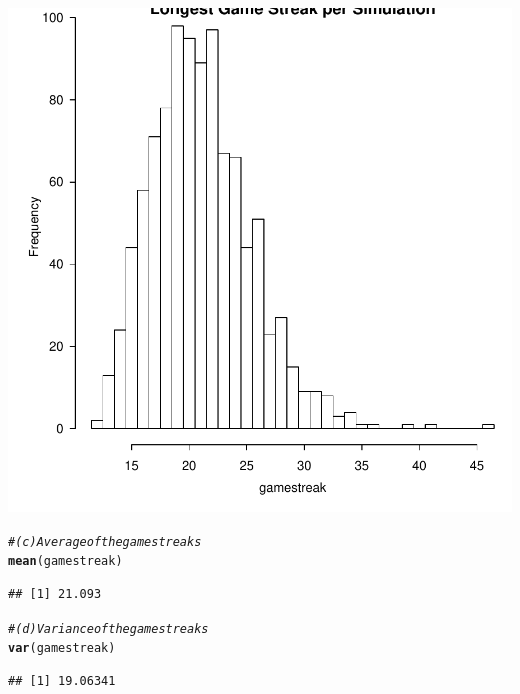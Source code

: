\documentclass{article}\usepackage[]{graphicx}\usepackage[]{color}
\makeatletter
\newcommand{\hlcom}[1]{\textcolor[rgb]{0.678,0.584,0.686}{\textit{#1}}}%
\newcommand{\hlstd}[1]{\textcolor[rgb]{0.345,0.345,0.345}{#1}}%
\newcommand{\hlkwd}[1]{\textcolor[rgb]{0.737,0.353,0.396}{\textbf{#1}}}%
\newenvironment{kframe}{%
 \def\at@end@of@kframe{}%
 \ifinner\ifhmode%
  \def\at@end@of@kframe{\end{minipage}}%
  \begin{minipage}{\columnwidth}%
 \fi\fi%
 \def\FrameCommand##1{\hskip\@totalleftmargin \hskip-\fboxsep
 \colorbox{shadecolor}{##1}\hskip-\fboxsep
     \hskip-\linewidth \hskip-\@totalleftmargin \hskip\columnwidth}%
 \MakeFramed {\advance\hsize-\width
   \@totalleftmargin\z@ \linewidth\hsize
   \@setminipage}}%
 {\par\unskip\endMakeFramed%
 \at@end@of@kframe}
\newenvironment{knitrout}{}{} %
\makeatother
\begin{document}
\begin{knitrout}
{\centering \includegraphics[width=.6\linewidth]{figure/FinalLab-Rnwunnamed-chunk-2-1} 

}


\begin{kframe}\begin{alltt}
\hlcom{#(c) Average of the game streaks}
\hlkwd{mean}\hlstd{(gamestreak)}
\end{alltt}
\begin{verbatim}
## [1] 21.093
\end{verbatim}
\begin{alltt}
\hlcom{#(d) Variance of the game streaks}
\hlkwd{var}\hlstd{(gamestreak)}
\end{alltt}
\begin{verbatim}
## [1] 19.06341
\end{verbatim}
\end{kframe}
\end{knitrout}
\end{document}

